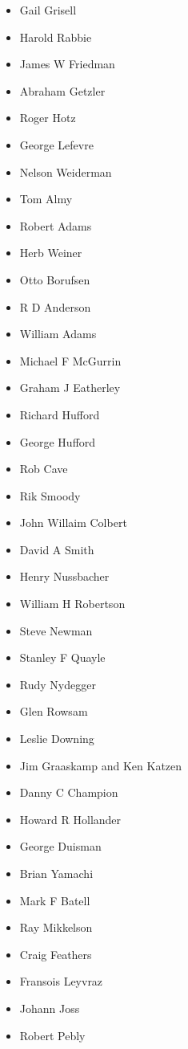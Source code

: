 \documentclass{article}
\begin{document}
\begin{multicols}{3}
\begin{itemize}
    \item Gail Grisell	
    \item Harold Rabbie
    \item James W Friedman
    \item Abraham Getzler
    \item Roger Hotz
    \item George Lefevre
    \item Nelson Weiderman
    \item Tom Almy
    \item Robert Adams
    \item Herb Weiner
    \item Otto Borufsen
    \item R D Anderson
    \item William Adams
    \item Michael F McGurrin
    \item Graham J Eatherley
    \item Richard Hufford
    \item George Hufford
    \item Rob Cave
    \item Rik Smoody
    \item John Willaim Colbert
    \item David A Smith
    \item Henry Nussbacher
    \item William H Robertson
    \item Steve Newman
    \item Stanley F Quayle
    \item Rudy Nydegger
    \item Glen Rowsam
    \item Leslie Downing
    \item Jim Graaskamp and Ken Katzen
    \item Danny C Champion
    \item Howard R Hollander
    \item George Duisman
    \item Brian Yamachi
    \item Mark F Batell
    \item Ray Mikkelson
    \item Craig Feathers
    \item Fransois Leyvraz
    \item Johann Joss
    \item Robert Pebly

\end{itemize}
\end{multicols}
\end{document}
